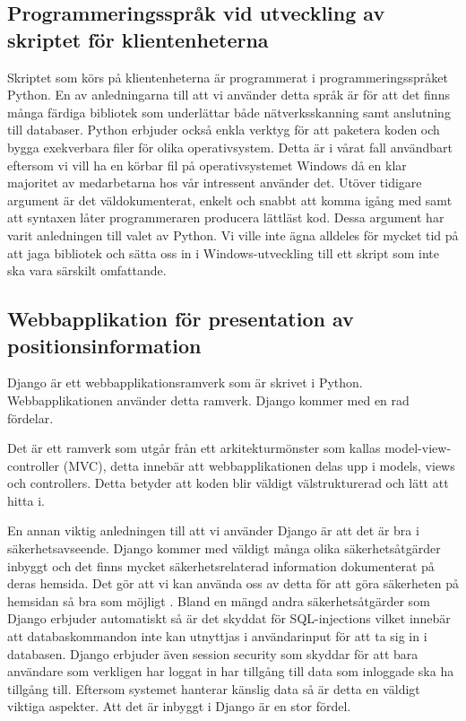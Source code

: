 \documentclass[swedish, a4paper,12pt]{article}
\begin{document}
\subsection{Programmeringsspråk vid utveckling av skriptet för klientenheterna}
Skriptet som körs på klientenheterna är programmerat i programmeringsspråket Python. En av anledningarna till att vi använder detta språk är för att det finns många färdiga bibliotek som underlättar både nätverksskanning samt anslutning till databaser. Python erbjuder också enkla verktyg för att paketera koden och bygga exekverbara filer för olika operativsystem. Detta är i vårat fall användbart eftersom vi vill ha en körbar fil på operativsystemet Windows då en klar majoritet av medarbetarna hos vår intressent använder det. Utöver tidigare argument är det väldokumenterat, enkelt och snabbt att komma igång med samt att syntaxen låter programmeraren producera lättläst kod. Dessa argument har varit anledningen till valet av Python. Vi ville inte ägna alldeles för mycket tid på att jaga bibliotek och sätta oss in i Windows-utveckling till ett skript som inte ska vara särskilt omfattande.

\subsection{Webbapplikation för presentation av positionsinformation}\label{django}
Django är ett webbapplikationsramverk som är skrivet i Python. Webbapplikationen använder detta ramverk. Django kommer med en rad fördelar.

Det är ett ramverk som utgår från ett arkitekturmönster som kallas model-view-controller (MVC)\cite{djangoMVC}, detta innebär att webbapplikationen delas upp i models, views och controllers. Detta betyder att koden blir väldigt välstrukturerad och lätt att hitta i.

En annan viktig anledningen till att vi använder Django är att det är bra i säkerhetsavseende. Django kommer med väldigt många olika säkerhetsåtgärder inbyggt och det finns mycket säkerhetsrelaterad information dokumenterat på deras hemsida. Det gör att vi kan använda oss av detta för att göra säkerheten på hemsidan så bra som möjligt \cite{securityInDjango}. Bland en mängd andra säkerhetsåtgärder som Django erbjuder automatiskt så är det skyddat för SQL-injections \cite{securityInDjango} vilket innebär att databaskommandon inte kan utnyttjas i användarinput för att ta sig in i databasen. Django erbjuder även session security \cite{securityInDjango} som skyddar för att bara användare som verkligen har loggat in har tillgång till data som inloggade ska ha tillgång till.
Eftersom systemet hanterar känslig data så är detta en väldigt viktiga aspekter. Att det är inbyggt i Django är en stor fördel.
\end{document}
